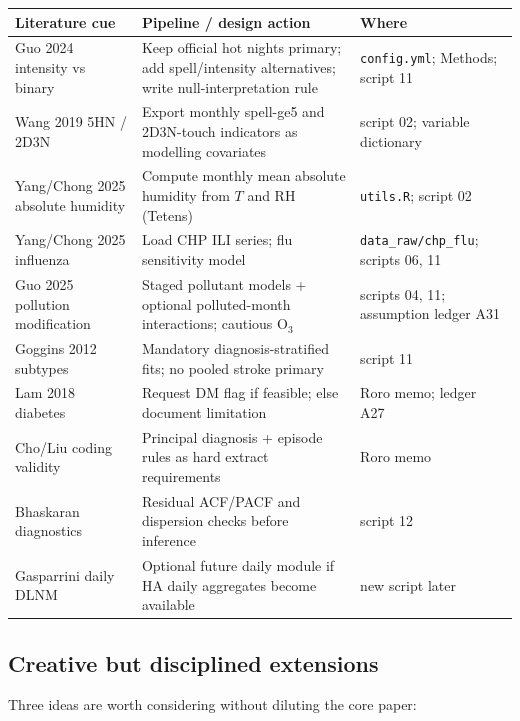 \documentclass[11pt]{article}
\begin{document}
\begin{center}
\renewcommand{\arraystretch}{1.15}
\begin{tabularx}{\textwidth}{@{}>{\raggedright\arraybackslash}p{3.2cm} X >{\raggedright\arraybackslash}p{2.4cm}@{}}
\toprule
\textbf{Literature cue} & \textbf{Pipeline / design action} & \textbf{Where} \\
\midrule
Guo 2024 intensity vs binary
  & Keep official hot nights primary; add spell/intensity alternatives; write null-interpretation rule
  & \texttt{config.yml}; Methods; script 11 \\
Wang 2019 5HN / 2D3N
  & Export monthly spell-ge5 and 2D3N-touch indicators as modelling covariates
  & script 02; variable dictionary \\
Yang/Chong 2025 absolute humidity
  & Compute monthly mean absolute humidity from $T$ and RH (Tetens)
  & \texttt{utils.R}; script 02 \\
Yang/Chong 2025 influenza
  & Load CHP ILI series; flu sensitivity model
  & \texttt{data\_raw/chp\_flu}; scripts 06, 11 \\
Guo 2025 pollution modification
  & Staged pollutant models + optional polluted-month interactions; cautious O$_3$
  & scripts 04, 11; assumption ledger A31 \\
Goggins 2012 subtypes
  & Mandatory diagnosis-stratified fits; no pooled stroke primary
  & script 11 \\
Lam 2018 diabetes
  & Request DM flag if feasible; else document limitation
  & Roro memo; ledger A27 \\
Cho/Liu coding validity
  & Principal diagnosis + episode rules as hard extract requirements
  & Roro memo \\
Bhaskaran diagnostics
  & Residual ACF/PACF and dispersion checks before inference
  & script 12 \\
Gasparrini daily DLNM
  & Optional future daily module if HA daily aggregates become available
  & new script later \\
\bottomrule
\end{tabularx}
\end{center}

\subsection{Creative but disciplined extensions}

Three ideas are worth considering without diluting the core paper:
\end{document}
